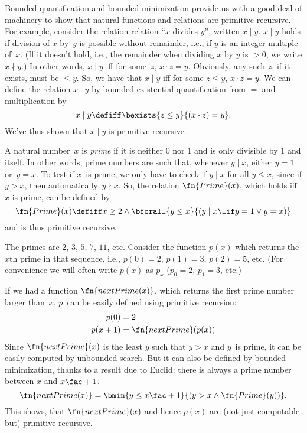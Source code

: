 \documentclass[../../../include/open-logic-section]{subfiles}
\begin{document}

Bounded quantification and bounded minimization provide us with a good
deal of machinery to show that natural functions and relations are
primitive recursive. For example, consider the relation relation ``$x$
divides $y$'', written $x \mid y$.  $x \mid y$ holds if division of
$x$ by~$y$ is possible without remainder, i.e., if $y$ is an integer
multiple of~$x$.  (If it doesn't hold, i.e., the remainder when
dividing $x$ by $y$ is $> 0$, we write $x \nmid y$.) In other words,
$x \mid y$ iff for some~$z$, $x \cdot z = y$.  Obviously, any such
$z$, if it exists, must be $\leq y$. So, we have that $x \mid y$ iff
for some $z \le y$, $x \cdot z = y$.  We can define the relation $x
\mid y$ by bounded existential quantification from $=$ and
multiplication by
\[
x \mid y \defiff \bexists{z \leq y}{(x \cdot z) = y}.
\]
We've thus shown that $x \mid y$ is primitive recursive.

A natural number~$x$ is \emph{prime} if it is neither $0$ nor $1$ and
is only divisible by $1$ and itself. In other words, prime numbers are
such that, whenever $y \mid x$, either $y = 1$ or~$y=x$.  To test if
$x$~is prime, we only have to check if $y \mid x$ for all $y \le x$,
since if $y > x$, then automatically~$y \nmid x$.  So, the relation
$\fn{Prime}(x)$, which holds iff $x$ is prime, can be defined by
\[
\fn{Prime}(x) \defiff x \geq 2 \land \bforall{y \leq x}{(y \mid x \lif y
  = 1 \lor y = x)}
\]
and is thus primitive recursive.

The primes are $2$, $3$, $5$, $7$, $11$, etc. Consider the function
$p(x)$ which returns the $x$th prime in that sequence, i.e., $p(0) =
2$, $p(1) = 3$, $p(2) = 5$, etc. (For convenience we will often write
$p(x)$ as $p_x$ ($p_0=2$, $p_1=3$, etc.)

If we had a function
$\fn{nextPrime(x)}$, which returns the first prime number larger
than~$x$, $p$~can be easily defined using primitive recursion:
\begin{align*}
  p(0) & = 2\\
  p(x+1) & = \fn{nextPrime}(p(x))
\end{align*}
Since $\fn{nextPrime}(x)$ is the least $y$ such that $y > x$ and
$y$~is prime, it can be easily computed by unbounded search. But it
can also be defined by bounded minimization, thanks to a result due to
Euclid: there is always a prime number between $x$ and $x\fac+1$.
\[
  \fn{nextPrime(x)} =
  \bmin{y \leq x\fac+1}{(y > x \land \fn{Prime}(y))}.
\]
This shows, that $\fn{nextPrime}(x)$ and hence $p(x)$ are (not just
computable but) primitive recursive.
\end{document}
